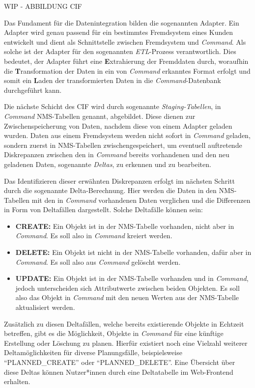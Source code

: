 WIP - ABBILDUNG CIF

Das Fundament für die Datenintegration bilden die sogenannten Adapter. Ein Adapter wird genau passend für ein bestimmtes Fremdsystem eines Kunden entwickelt und dient als Schnittstelle zwischen Fremdsystem und \textit{Command}. Als solche ist der Adapter für den sogenannten \textit{ETL}-Prozess verantwortlich. Dies bedeutet, der Adapter führt eine \textbf{E}xtrahierung der Fremddaten durch, woraufhin die \textbf{T}ransformation der Daten in ein von \textit{Command} erkanntes Format erfolgt und somit ein \textbf{L}aden der transformierten Daten in die \textit{Command}-Datenbank durchgeführt kann.

Die nächste Schicht des \ac{CIF} wird durch sogenannte \textit{Staging-Tabellen}, in \textit{Command} \ac{NMS}-Tabellen genannt, abgebildet. Diese dienen zur Zwischenspeicherung von Daten, nachdem diese von einem Adapter geladen wurden. Daten aus einem Fremdsystem werden nicht sofort in \textit{Command} geladen, sondern zuerst in \ac{NMS}-Tabellen zwischengespeichert, um eventuell auftretende Diskrepanzen zwischen den in \textit{Command} bereits vorhandenen und den neu geladenen Daten, sogenannte \textit{Deltas}, zu erkennen und zu bearbeiten. 

Das Identifizieren dieser erwähnten Diskrepanzen erfolgt im nächsten Schritt durch die sogenannte Delta-Berechnung. Hier werden die Daten in den \ac{NMS}-Tabellen mit den in \textit{Command} vorhandenen Daten verglichen und die Differenzen in Form von Deltafällen dargestellt. Solche Deltafälle können sein:
\begin{itemize}
    \item \textbf{CREATE:} Ein Objekt ist in der \ac{NMS}-Tabelle vorhanden, nicht aber in \textit{Command}. Es soll also in \textit{Command} kreiert werden.
    \item \textbf{DELETE:} Ein Objekt ist nicht in der \ac{NMS}-Tabelle vorhanden, dafür aber in \textit{Command}. Es soll also aus \textit{Command} gelöscht werden.
    \item  \textbf{UPDATE:} Ein Objekt ist in der \ac{NMS}-Tabelle vorhanden und in \textit{Command}, jedoch unterscheiden sich Attributwerte zwischen beiden Objekten. Es soll also das Objekt in \textit{Command} mit den neuen Werten aus der \ac{NMS}-Tabelle aktualisiert werden.
\end{itemize}

Zusätzlich zu diesen Deltafällen, welche bereits existierende Objekte in Echtzeit betreffen, gibt es die Möglichkeit, Objekte in \textit{Command} für eine künftige Erstellung oder Löschung zu planen. Hierfür existiert noch eine Vielzahl weiterer Deltamöglichkeiten für diverse Planungsfälle, beispielsweise \enquote{PLANNED\_CREATE} oder \enquote{PLANNED\_DELETE}. Eine Übersicht über diese Deltas können Nutzer*innen durch eine Deltatabelle im Web-Frontend erhalten.

